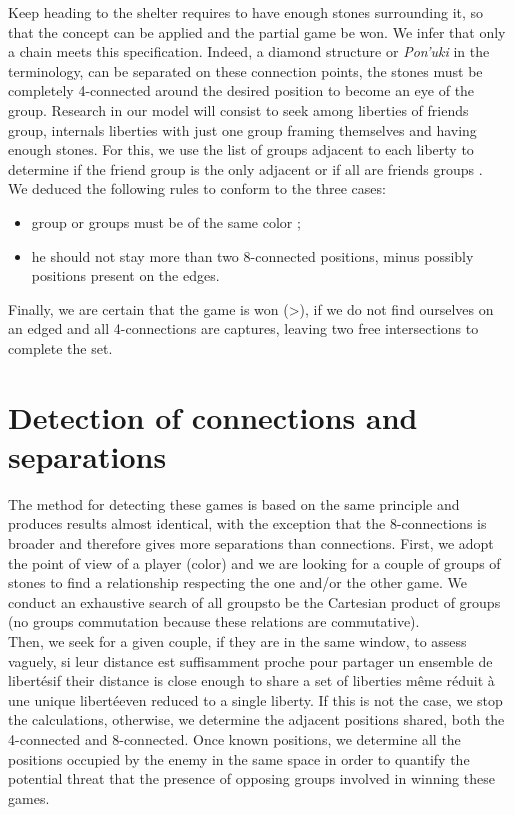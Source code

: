 \documentclass[a4paper,10pt,twoside]{report}
\begin{document}
	Keep heading to the shelter requires to have enough stones surrounding it, so that the concept can be applied and the partial game be won. We infer that only a chain meets this specification. Indeed, a diamond structure or \emph{Pon'uki} in the terminology, can be separated on these connection points, the stones must be completely 4-connected around the desired position to become an eye of the group. Research in our model will consist to seek among liberties of friends group, internals liberties with just one group framing themselves and having enough stones. For this, we use the list of groups adjacent to each liberty to determine if the friend group is the only adjacent or if all are friends groups .\\

		We deduced the following rules to conform to the three cases:
		\vspace{3mm}
		\begin{itemize}
			\item{group or groups must be of the same color ;}
			\vspace{1mm}
			\item{he should not stay more than two 8-connected positions, minus possibly positions present on the edges.}
			\vspace{3mm}
		\end{itemize}

	Finally, we are certain that the game is won (>), if we do not find ourselves on an edged and all 4-connections are captures, leaving two free intersections to complete the set.

	\section{Detection of connections and separations} 
	\vspace{4mm}
	
	The method for detecting these games is based on the same principle and produces results almost identical, with the exception that the 8-connections is broader and therefore gives more separations than connections. First, we adopt the point of view of a player (color) and we are looking for a couple of groups of stones to find a relationship respecting the one and/or the other game. We conduct an exhaustive search of all groupsto be the Cartesian product of groups (no groups commutation because these relations are commutative).\\

	Then, we seek for a given couple, if they are in the same window, to assess vaguely, si leur distance est suffisamment proche pour partager un ensemble de libertésif their distance is close enough to share a set of liberties même réduit à une unique libertéeven reduced to a single liberty. If this is not the case, we stop the calculations, otherwise, we determine the adjacent positions shared, both the 4-connected and 8-connected. Once known positions, we determine all the positions occupied by the enemy in the same space in order to quantify the potential threat that the presence of opposing groups involved in winning these games.\\
\end{document}
